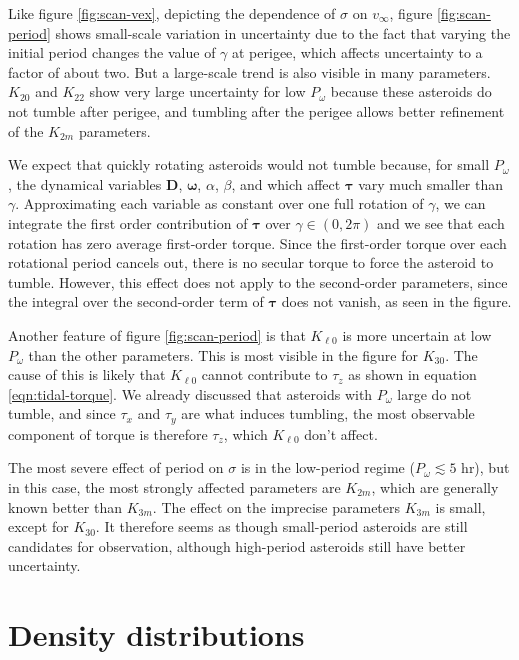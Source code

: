 \documentclass[fleqn,usenatbib]{mnras}
\begin{document}
Like figure \ref{fig:scan-vex}, depicting the dependence of $\sigma$ on $v_\infty$, figure \ref{fig:scan-period} shows small-scale variation in uncertainty due to the fact that varying the initial period changes the value of $\gamma$ at perigee, which affects uncertainty to a factor of about two. But a large-scale trend is also visible in many parameters. $K_{20}$ and $K_{22}$ show very large uncertainty for low $P_\omega$ because these asteroids do not tumble after perigee, and tumbling after the perigee allows better refinement of the $K_{2m}$ parameters. 

We expect that quickly rotating asteroids would not tumble because, for small $P_\omega$, the dynamical variables $\bm D$, $\bm \omega$, $\alpha$, $\beta$, and which affect $\bm \tau$ vary much smaller than $\gamma$. Approximating each variable as constant over one full rotation of $\gamma$, we can integrate the first order contribution of $\bm \tau$ over $\gamma \in (0, 2\pi)$ and we see that each rotation has zero average first-order torque. Since the first-order torque over each rotational period cancels out, there is no secular torque to force the asteroid to tumble. However, this effect does not apply to the second-order parameters, since the integral over the second-order term of $\bm \tau$ does not vanish, as seen in the figure.

Another feature of figure \ref{fig:scan-period} is that $K_{\ell 0}$ is more uncertain at low $P_\omega$ than the other parameters. This is most visible in the figure for $K_{30}$. The cause of this is likely that $K_{\ell 0}$ cannot contribute to $\tau_z$ as shown in equation \ref{eqn:tidal-torque}. We already discussed that asteroids with $P_\omega$ large do not tumble, and since $\tau_x$ and $\tau_y$ are what induces tumbling, the most observable component of torque is therefore $\tau_z$, which $K_{\ell 0}$ don't affect.

The most severe effect of period on $\sigma$ is in the low-period regime ($P_\omega \lesssim 5$ hr), but in this case, the most strongly affected parameters are $K_{2m}$, which are generally known better than $K_{3m}$. The effect on the imprecise parameters $K_{3m}$ is small, except for $K_{30}$. It therefore seems as though small-period asteroids are still candidates for observation, although high-period asteroids still have better uncertainty.


\section{Density distributions}
\label{sec:distros}
\end{document}
